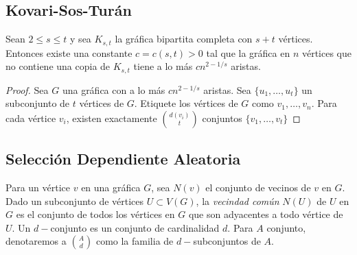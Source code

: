 \subsection{Kovari-Sos-Turán}
\begin{theorem}
    Sean $2 \leq s \leq t$ y sea $K_{s,t}$ la gráfica bipartita
    completa con $s + t$ vértices. Entonces existe una constante $c =
    c(s, t) > 0$ tal que
    la gráfica en $n$ vértices que no contiene una copia de $K_{s, t}$
    tiene a lo más
    $c n^{2 - 1/s}$ aristas.
\end{theorem}
\begin{proof}
Sea $G$ una gráfica con a lo más $cn^{2 - 1/s}$ aristas.
Sea $\{u_1, \ldots, u_t\}$ un subconjunto de $t$ vértices de $G$.
Etiquete los vértices de $G$ como $v_1, \ldots, v_n$. Para cada vértice
$v_i$, existen exactamente $\binom{d(v_i)}{t}$ conjuntos $\{v_1,
\ldots, v_t\}$
\end{proof}

\subsection{Selección Dependiente Aleatoria}
Para un vértice $v$ en una gráfica $G$, sea $N(v)$ el conjunto de
vecinos de $v$ en $G$. Dado un subconjunto de vértices $U \subset
V(G)$, la \textit{vecindad común} $N(U)$ de $U$ en $G$ es el conjunto
de todos los vértices en $G$ que son adyacentes a todo vértice de $U$.
Un $d-$conjunto es un conjunto de cardinalidad $d$. Para $A$
conjunto, denotaremos a $\binom{A}{d}$ como la familia de
$d-$subconjuntos de $A$.


